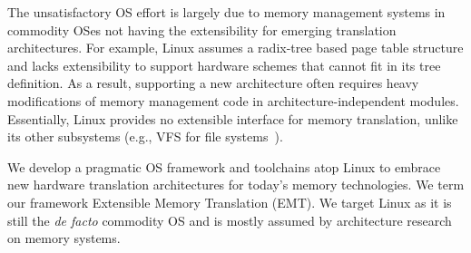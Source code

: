 
The unsatisfactory OS effort is largely due to memory management systems in 
	commodity OSes not having the extensibility
	for emerging translation architectures.
For example, Linux 
    assumes a radix-tree based page table structure
    and lacks extensibility to support hardware schemes that cannot fit in its tree 
    definition.
As a result, supporting a new architecture often requires heavy
    modifications of memory management code
    in architecture-independent modules.
Essentially, Linux provides no extensible
	interface for memory translation,
	unlike its
	other subsystems (e.g., VFS for file systems~\cite{linux:vfs}). 



We develop a pragmatic OS framework and toolchains
	atop Linux to embrace 
	new hardware translation architectures for today's memory technologies.
We term our framework 
	Extensible Memory Translation (EMT).
We target Linux %
	as it is 
	still the {\it de facto} commodity OS and 
	is mostly assumed by architecture research on memory systems.

